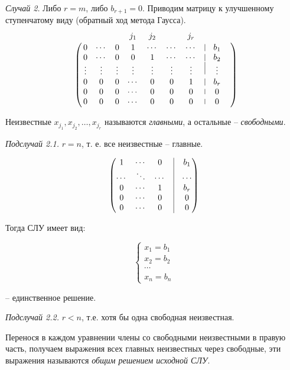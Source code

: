 \textit{Случай 2.} Либо $r = m$, либо $b_{r+1} = 0$. Приводим матрицу к улучшенному ступенчатому виду (обратный ход метода Гаусса).
\begin{equation*}
	\bordermatrix{ 
    	 & & & & j_1 & j_2 & & j_r & \cr
    	 & 0 & \cdots & 0 & 1 & \cdots & \cdots & \cdots & \vrule & b_1 \cr
		 & 0 & \cdots & 0 & 0 & 1 & \cdots & \cdots & \vrule & b_2 \cr
        & \vdots & \vdots & \vdots& \vdots & \vdots & \vdots & \vdots & \vrule & \vdots & \cr 
        & 0 & 0 & 0 & \cdots & 0 & 0 & 1 & \vrule & b_r \cr
        & 0 & 0 & 0 & \cdots & 0 & 0 & 0 & \vrule & 0 \cr
        & 0 & 0 & 0 & \cdots & 0 & 0 & 0 & \vrule & 0}
\end{equation*}

Неизвестные $x_{j_1}, x_{j_2}, \dots , x_{j_r}$ называются \textit{главными}, а остальные -- \textit{свободными}.

\vspace{\baselineskip}
\textit{Подслучай 2.1.} $r = n$, т. е. все неизвестные -- главные.

\begin{equation*}
	\begin{pmatrix}
		1 & \cdots & 0 & \vrule & b_1 \\
        \cdots & \ddots & \cdots & \vrule & \cdots \\
        0 & \cdots & 1 & \vrule & b_r \\
       0 & \cdots & 0 & \vrule & 0 \\
       0 & \cdots & 0 & \vrule & 0
	\end{pmatrix}
\end{equation*}

Тогда СЛУ имеет вид: 

\begin{equation*}
	\left\{
		\begin{aligned}
        x_1 = b_1 \\
        x_2 = b_2 \\
        \cdots \\
        x_n = b_n
		\end{aligned}
	\right.
\end{equation*}

-- единственное решение.

\vspace{\baselineskip}
\textit{Подслучай 2.2.} $r < n$, т.е. хотя бы одна свободная неизвестная.

Перенося в каждом уравнении члены со свободными неизвестными в правую часть, получаем выражения всех главных неизвестных через свободные, эти выражения называются \textit{общим решением исходной СЛУ}.

